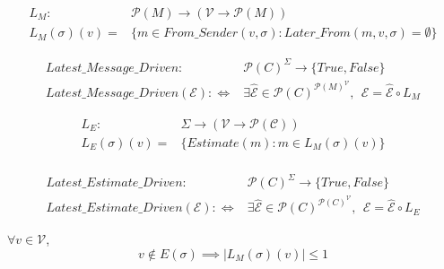\begin{defn}
\begin{align*}
L_M:& \mathcal{P}(M) \to (\mathcal{V} \to \mathcal{P}(M)) \\
L_M(\sigma)(v) =& \{m \in From\_Sender(v, \sigma):  Later\_From(m, v, \sigma) = \emptyset \}
\end{align*}
\end{defn}

\begin{defn}
\begin{align*}
Latest\_Message\_Driven:& \mathcal{P}(C)^\Sigma \to \{True, False\} \\
Latest\_Message\_Driven(\mathcal{E}) :\Leftrightarrow& \exists \hat{\mathcal{E}} \in \mathcal{P}(C)^{\mathcal{P}(M)^\mathcal{V}}, ~~\mathcal{E} = \hat{\mathcal{E}} \circ L_M
\end{align*}
\end{defn}

\begin{defn}
\begin{align*}
L_E:&\Sigma \to (\mathcal{V} \to \mathcal{P}(\mathcal{C})) \\
L_E(\sigma)(v) =& \{Estimate(m): m \in L_M(\sigma)(v)\} \\
\end{align*}
\end{defn}

\begin{defn}
\begin{align*}
Latest\_Estimate\_Driven:& \mathcal{P}(C)^\Sigma \to \{True, False\} \\
Latest\_Estimate\_Driven(\mathcal{E}) :\Leftrightarrow& \exists \hat{\mathcal{E}} \in \mathcal{P}(C)^{\mathcal{P}(C)^\mathcal{V}}, ~~\mathcal{E} = \hat{\mathcal{E}} \circ L_E
\end{align*}
\end{defn}

\begin{lemma}
$\forall v \in \mathcal{V}$,
$$
v \notin E(\sigma) \implies |L_M(\sigma)(v)| \leq 1
$$
\end{lemma}


